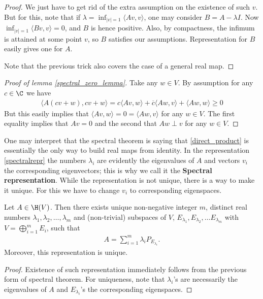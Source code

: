 \begin{proof}
	We just have to get rid of the extra assumption on the existence of such $v$. But for this, note that if $\lambda = \inf_{|v| = 1} \langle A v, v \rangle$, one may consider $B = A - \lambda I$. Now $\inf_{|v| = 1} \langle B v, v \rangle = 0$, and $B$ is hence positive. Also, by compactness, the infimum is attained at some point $v$, so $B$ satisfies our assumptions. Representation for $B$ easily gives one for $A$.

	Note that the previous trick also covers the case of a general real map.
\end{proof}

\begin{proof}[Proof of lemma \ref{spectral_zero_lemma}]
	Take any $w \in V$. By assumption for any $c \in \C$ we have
	\begin{align*}
		\langle A (c v + w), c v + w \rangle = c \langle A v, w \rangle + \overline{c} \langle A w, v \rangle + \langle A w, w \rangle \geq 0
	\end{align*}
	But this easily implies that $\langle A v, w \rangle = 0 = \langle A w, v \rangle$ for any $w \in V$. The first equality implies that $A v = 0$ and the second that $A w \perp v$ for any $w \in V$.
\end{proof}

One may interpret that the spectral theorem is saying that \ref{direct_product} is essentially the only way to build real maps from identity. In the representation \ref{spectralrepr} the numbers $\lambda_{i}$ are evidently the eigenvalues of $A$ and vectors $v_{i}$ the corresponding eigenvectors; this is why we call it the \textbf{Spectral representation}. While the representation is not unique, there is a way to make it unique. For this we have to change $v_{i}$ to corresponding eigenspaces.

\begin{lause}
	Let $A \in \H(V)$. Then there exists unique non-negative integer $m$, distinct real numbers $\lambda_{1}, \lambda_{2}, \ldots, \lambda_{m}$ and (non-trivial) subspaces of $V$, $E_{\lambda_{1}}, E_{\lambda_{2}}, \ldots E_{\lambda_{m}}$ with $V = \bigoplus_{i = 1}^{m} E_{i}$, such that
	\begin{align}\label{spectralrepr2}
		A = \sum_{i = 1}^{m} \lambda_{i} P_{E_{\lambda_{i}}}.
	\end{align}
	Moreover, this representation is unique.
\end{lause}
\begin{proof}
	Existence of such representation immediately follows from the previous form of spectral theorem. For uniqueness, note that $\lambda_{i}$'s are necessarily the eigenvalues of $A$ and $E_{\lambda_{i}}$'s the corresponding eigenspaces.
\end{proof}

